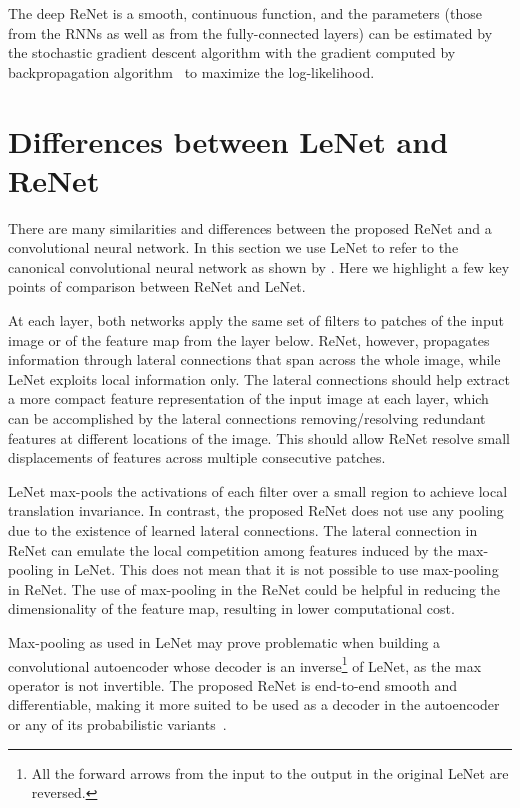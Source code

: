 The deep ReNet is a smooth, continuous function, and the parameters (those from
the RNNs as well as from the fully-connected layers) can be estimated by the
stochastic gradient descent algorithm with the gradient computed by
backpropagation algorithm~\citep[see, e.g.,][]{BP86} to maximize the
log-likelihood.

\section{Differences between LeNet and ReNet}
\label{sec:lenetrenet}

There are many similarities and differences between the proposed ReNet and a
convolutional neural network. In this section we use LeNet to refer to the
canonical convolutional neural network as shown by \citet{LeCun89}. Here we
highlight a few key points of comparison between ReNet and LeNet.

At each layer, both networks apply the same set of filters to patches of the
input image or of the feature map from the layer below. ReNet, however,
propagates information through lateral connections that span across the whole
image, while LeNet exploits local information only. The lateral connections
should help extract a more compact feature representation of the input image at
each layer, which can be accomplished by the lateral connections
removing/resolving redundant features at different locations of the image. This
should allow ReNet resolve small displacements of features across multiple
consecutive patches.

LeNet max-pools the activations of each filter over a small region to achieve
local translation invariance. In contrast, the proposed ReNet does not use any
pooling due to the existence of learned lateral connections. The lateral
connection in ReNet can emulate the local competition among features induced by
the max-pooling in LeNet.  This does not mean that it is not possible to use
max-pooling in ReNet. The use of max-pooling in the ReNet could be helpful in
reducing the dimensionality of the feature map, resulting in lower computational
cost.

Max-pooling as used in LeNet may prove problematic when building a
convolutional autoencoder whose decoder is an inverse\footnote{
    All the forward arrows from the input to the output in the original LeNet
    are reversed.
}
of LeNet, as the max operator is not invertible. The proposed
ReNet is end-to-end smooth and differentiable, making it more suited to be used
as a decoder in the autoencoder or any of its probabilistic variants~\citep[see,
e.g.,][]{Kingma+Welling-ICLR2014}.

